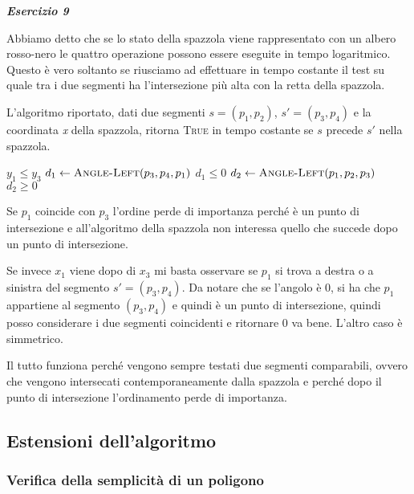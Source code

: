 \textit{\textbf{Esercizio 9}} 

Abbiamo detto che se lo stato della spazzola viene rappresentato con un albero rosso-nero le quattro operazione possono essere eseguite in tempo logaritmico.
Questo è vero soltanto se riusciamo ad effettuare in tempo costante il test su quale tra i due segmenti ha l'intersezione più alta con la retta della spazzola.

L'algoritmo riportato, dati due segmenti $s = (p_1,p_2)$, $s' = (p_3, p_4)$ e la coordinata \textit{x} della spazzola, ritorna \textsc{True} in tempo costante se $s$ precede $s'$ nella spazzola.

\begin{breakablealgorithm}
	\begin{algorithmic}[1]
				\State \Return $y_1 \leq y_3$ 
			\EndIf
				\State $d_1 \gets \textsc{Angle-Left}(p_3,p_4,p_1)$
				\State \Return $d_1 \leq 0$
			\Else {}
				\State $d_2 \gets \textsc{Angle-Left}(p_1,p_2,p_3)$
				\State \Return $d_2 \geq 0$
			\EndIf
		\EndFunction
	\end{algorithmic}
\end{breakablealgorithm}

Se $p_1$ coincide con $p_3$ l'ordine perde di importanza perché è un punto di intersezione e all'algoritmo della spazzola non interessa quello che succede dopo un punto di intersezione.

Se invece $x_1$ viene dopo di $x_3$ mi basta osservare se $p_1$ si trova a destra o a sinistra del segmento $s' = (p_3,p_4)$. 
Da notare che se l'angolo è 0, si ha che $p_1$ appartiene al segmento $(p_3,p_4)$ e quindi è un punto di intersezione, quindi posso considerare i due segmenti coincidenti e ritornare 0 va bene. L'altro caso è simmetrico.

Il tutto funziona perché vengono sempre testati due segmenti comparabili, ovvero che vengono intersecati contemporaneamente dalla spazzola e perché dopo il punto di intersezione l'ordinamento perde di importanza.

\subsection{Estensioni dell'algoritmo}

\subsubsection{Verifica della semplicità di un poligono}

